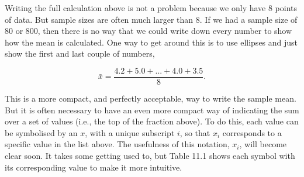\documentclass[
  openany]{scrbook}
\begin{document}
Writing the full calculation above is not a problem because we only have 8 points of data.
But sample sizes are often much larger than 8.
If we had a sample size of 80 or 800, then there is no way that we could write down every number to show how the mean is calculated.
One way to get around this is to use ellipses and just show the first and last couple of numbers,

\[\bar{x} = \frac{4.2 + 5.0 + ... + 4.0 + 3.5}{8}.\]

This is a more compact, and perfectly acceptable, way to write the sample mean.
But it is often necessary to have an even more compact way of indicating the sum over a set of values (i.e., the top of the fraction above).
To do this, each value can be symbolised by an \(x\), with a unique subscript \(i\), so that \(x_{i}\) corresponds to a specific value in the list above.
The usefulness of this notation, \(x_{i}\), will become clear soon.
It takes some getting used to, but Table 11.1 shows each symbol with its corresponding value to make it more intuitive.
\end{document}
